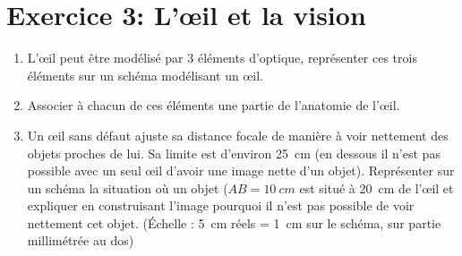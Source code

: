 \documentclass[a4paper,12pt]{article}
\begin{document}
\section*{Exercice 3: L'\oe il et la vision}
\begin{enumerate}
	\item L'\oe il peut être modélisé par 3 éléments d'optique, représenter ces trois éléments sur un schéma modélisant un \oe il.
	\item Associer à chacun de ces éléments une partie de l'anatomie de l'\oe il.
	\item Un \oe il sans défaut ajuste sa distance focale de manière à voir nettement des objets proches de lui. Sa limite est d'environ \SI{25}{cm} (en dessous il n'est pas possible avec un seul \oe il d'avoir une image nette d'un objet). Représenter sur un schéma la situation où un objet ($AB = \SI{10}{cm}$ est situé à \SI{20}{cm} de l'\oe il et expliquer en construisant l'image pourquoi il n'est pas possible de voir nettement cet objet. (Échelle : \SI{5}{cm} réels = \SI{1}{cm} sur le schéma, sur partie millimétrée au dos)
\end{enumerate}

\end{document}
